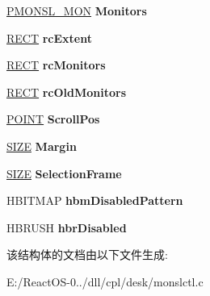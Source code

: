 \begin{DoxyCompactItemize}
\hyperlink{struct___m_o_n_s_l___m_o_n}{P\+M\+O\+N\+S\+L\+\_\+\+M\+ON} {\bfseries Monitors}
\item 
\mbox{\label{struct___m_o_n_i_t_o_r_s_e_l_w_n_d_a381b0afe9a6472cb178b91509bf20e01}} 
\hyperlink{structtag_r_e_c_t}{R\+E\+CT} {\bfseries rc\+Extent}
\item 
\mbox{\label{struct___m_o_n_i_t_o_r_s_e_l_w_n_d_a05a9c3131117612a2525c3a457af6940}} 
\hyperlink{structtag_r_e_c_t}{R\+E\+CT} {\bfseries rc\+Monitors}
\item 
\mbox{\label{struct___m_o_n_i_t_o_r_s_e_l_w_n_d_aeecc2e1b8b8e744621c03494b6831f19}} 
\hyperlink{structtag_r_e_c_t}{R\+E\+CT} {\bfseries rc\+Old\+Monitors}
\item 
\mbox{\label{struct___m_o_n_i_t_o_r_s_e_l_w_n_d_ae86443b1f5cc2bd7d40166ab65b1dcb1}} 
\hyperlink{structtag_p_o_i_n_t}{P\+O\+I\+NT} {\bfseries Scroll\+Pos}
\item 
\mbox{\label{struct___m_o_n_i_t_o_r_s_e_l_w_n_d_a64c99532e43374dd627cc7e96b9085f9}} 
\hyperlink{structtag_s_i_z_e}{S\+I\+ZE} {\bfseries Margin}
\item 
\mbox{\label{struct___m_o_n_i_t_o_r_s_e_l_w_n_d_a5796b68f37413a15d5c77c930f40d356}} 
\hyperlink{structtag_s_i_z_e}{S\+I\+ZE} {\bfseries Selection\+Frame}
\item 
\mbox{\label{struct___m_o_n_i_t_o_r_s_e_l_w_n_d_aa3d866543aa456c67f73f85973e6caa1}} 
H\+B\+I\+T\+M\+AP {\bfseries hbm\+Disabled\+Pattern}
\item 
\mbox{\label{struct___m_o_n_i_t_o_r_s_e_l_w_n_d_ac84a3466f48714da1796528fa3c68c85}} 
H\+B\+R\+U\+SH {\bfseries hbr\+Disabled}
\end{DoxyCompactItemize}


该结构体的文档由以下文件生成\+:\begin{DoxyCompactItemize}
\item 
E\+:/\+React\+O\+S-\/0../dll/cpl/desk/monslctl.\+c\end{DoxyCompactItemize}
